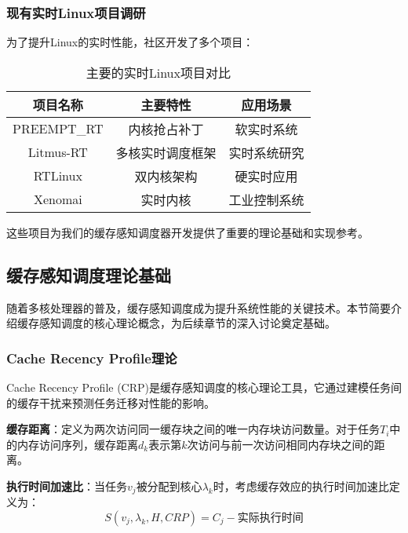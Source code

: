 \subsubsection{现有实时Linux项目调研}

为了提升Linux的实时性能，社区开发了多个项目：

\begin{table}[h]
\centering
\begin{tabular}{ccc}
\toprule
项目名称 & 主要特性 & 应用场景 \\
\midrule
PREEMPT\_RT & 内核抢占补丁 & 软实时系统 \\
\midrule
Litmus-RT & 多核实时调度框架 & 实时系统研究 \\
\midrule
RTLinux & 双内核架构 & 硬实时应用 \\
\midrule
Xenomai & 实时内核 & 工业控制系统 \\
\bottomrule
\end{tabular}
\caption{主要的实时Linux项目对比}
\label{tab:realtime-linux}
\end{table}

这些项目为我们的缓存感知调度器开发提供了重要的理论基础和实现参考。

\subsection{缓存感知调度理论基础}

随着多核处理器的普及，缓存感知调度成为提升系统性能的关键技术。\cite{r13_Cache-Aware_Scheduling_on_Heterogeneous_Multicore_Systems}\cite{r14_Cache-aware_task_scheduling}\cite{r16_Cache-Aware_Virtua}\cite{r1_面向嵌入式多核系统的缓存调度算法优化}本节简要介绍缓存感知调度的核心理论概念，为后续章节的深入讨论奠定基础。

\subsubsection{Cache Recency Profile理论}

Cache Recency Profile (CRP)是缓存感知调度的核心理论工具，它通过建模任务间的缓存干扰来预测任务迁移对性能的影响。\cite{r6_Miss_Rate_Calculation_of_L2Cache}

\textbf{缓存距离}：定义为两次访问同一缓存块之间的唯一内存块访问数量。对于任务$T_i$中的内存访问序列，缓存距离$d_k$表示第$k$次访问与前一次访问相同内存块之间的距离。\cite{r7_Minimizing_cache_usage}

\textbf{执行时间加速比}：当任务$v_j$被分配到核心$\lambda_k$时，考虑缓存效应的执行时间加速比定义为：
$$S(v_j, \lambda_k, H, CRP) = C_j - \text{实际执行时间}$$


